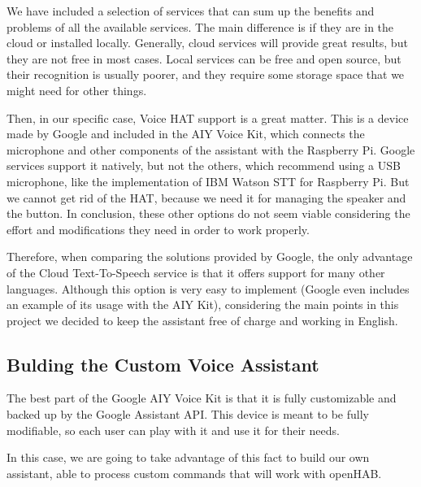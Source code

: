 \addtocounter{footnote}{-2}

We have included a selection of services that can sum up the benefits and problems of all the available services. The main difference
is if they are in the cloud or installed locally. Generally, cloud services will provide great results, but they are not free in
most cases. Local services can be free and open source, but their recognition is usually poorer, and they require some storage
space that we might need for other things.

Then, in our specific case, Voice HAT support is a great matter. This is a device made by Google and included in the AIY Voice Kit,
which connects the microphone and other components of the assistant with the Raspberry Pi. Google services support it natively,
but not the others, which recommend using a USB microphone, like the implementation of IBM Watson STT for Raspberry Pi. But we
cannot get rid of the HAT, because we need it for managing the speaker and the button. In conclusion, these other options do not
seem viable considering the effort and modifications they need in order to work properly.

Therefore, when comparing the solutions provided by Google, the only advantage of the Cloud Text-To-Speech service is that it offers
support for many other languages. Although this option is very easy to implement (Google even includes an example of its usage with
the AIY Kit), considering the main points in this project we decided to keep the assistant free of charge and working in English.

\subsection{Bulding the Custom Voice Assistant}
The best part of the Google AIY Voice Kit is that it is fully customizable and backed up by the Google Assistant API. This device
is meant to be fully modifiable, so each user can play with it and use it for their needs.

In this case, we are going to take advantage of this fact to build our own assistant, able to process custom commands that will
work with openHAB.

